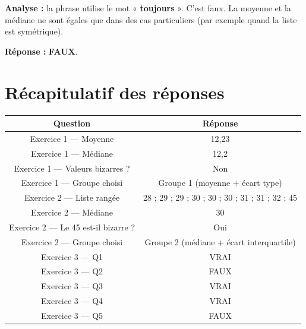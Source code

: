 \documentclass[12pt,a4paper]{article}
\begin{document}
\vspace{0.3cm}
\textbf{Analyse :} la phrase utilise le mot « \textbf{toujours} ». C'est faux. La moyenne et la médiane ne sont égales que dans des cas particuliers (par exemple quand la liste est symétrique).

\vspace{0.3cm}
\textbf{Réponse :} \textbf{FAUX}.

\vspace{0.5cm}

\section*{Récapitulatif des réponses}

\begin{center}
\renewcommand{\arraystretch}{1.8}
\begin{tabular}{|c|c|}
\hline
\textbf{Question} & \textbf{Réponse} \\
\hline
Exercice 1 — Moyenne & 12,23 \\
\hline
Exercice 1 — Médiane & 12,2 \\
\hline
Exercice 1 — Valeurs bizarres ? & Non \\
\hline
Exercice 1 — Groupe choisi & Groupe 1 (moyenne + écart type) \\
\hline
Exercice 2 — Liste rangée & 28 ; 29 ; 29 ; 30 ; 30 ; 30 ; 31 ; 31 ; 32 ; 45 \\
\hline
Exercice 2 — Médiane & 30 \\
\hline
Exercice 2 — Le 45 est-il bizarre ? & Oui \\
\hline
Exercice 2 — Groupe choisi & Groupe 2 (médiane + écart interquartile) \\
\hline
Exercice 3 — Q1 & VRAI \\
\hline
Exercice 3 — Q2 & FAUX \\
\hline
Exercice 3 — Q3 & VRAI \\
\hline
Exercice 3 — Q4 & VRAI \\
\hline
Exercice 3 — Q5 & FAUX \\
\hline
\end{tabular}
\end{center}

\vspace{0.5cm}
\end{document}
